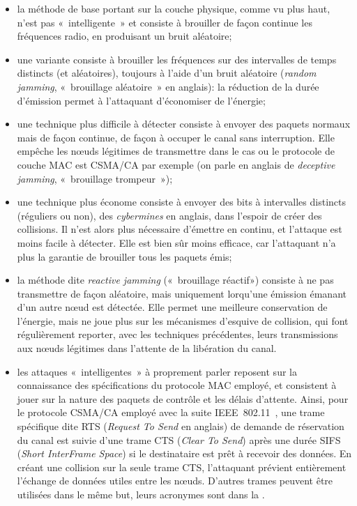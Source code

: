 \begin{itemize}
    \item la méthode de base portant sur la couche physique, comme vu plus haut, n'est pas « intelligente » et consiste à brouiller de façon continue les fréquences radio, en produisant un bruit aléatoire;
    \item une variante consiste à brouiller les fréquences sur des intervalles de temps distincts (et aléatoires), toujours à l'aide d'un bruit aléatoire (\textit{random jamming}, « brouillage aléatoire » en anglais): la réduction de la durée d'émission permet à l'attaquant d'économiser de l'énergie;
    \item une technique plus difficile à détecter consiste à envoyer des paquets normaux mais de façon continue, de façon à occuper le canal sans interruption. Elle empêche les nœuds légitimes de transmettre dans le cas ou le protocole de couche MAC est CSMA/CA par exemple (on parle en anglais de \textit{deceptive jamming}, « brouillage trompeur »);
    \item une technique plus économe consiste à envoyer des bits à intervalles distincts (réguliers ou non), des \textit{cybermines} en anglais, dans l'espoir de créer des collisions. Il n'est alors plus nécessaire d'émettre en continu, et l'attaque est moins facile à détecter. Elle est bien sûr moins efficace, car l'attaquant n'a plus la garantie de brouiller tous les paquets émis;
    \item la méthode dite \textit{reactive jamming} (« brouillage réactif») consiste à ne pas transmettre de façon aléatoire, mais uniquement lorqu'une émission émanant d'un autre nœud est détectée. Elle permet une meilleure conservation de l'énergie, mais ne joue plus sur les mécanismes d'esquive de collision, qui font régulièrement reporter, avec les techniques précédentes, leurs transmissions aux nœuds légitimes dans l'attente de la libération du canal.
    \item les attaques « intelligentes » à proprement parler reposent sur la connaissance des spécifications du protocole MAC employé, et consistent à jouer sur la nature des paquets de contrôle et les délais d'attente. Ainsi, pour le protocole CSMA/CA employé avec la suite IEEE~802.11~\cite{ieee802.11}, une trame spécifique dite RTS (\textit{Request To Send} en anglais) de demande de réservation du canal est suivie d'une trame CTS (\textit{Clear To Send}) après une durée SIFS (\textit{Short InterFrame Space}) si le destinataire est prêt à recevoir des données. En créant une collision sur la seule trame CTS, l'attaquant prévient entièrement l'échange de données utiles entre les nœuds. D'autres trames peuvent être utilisées dans le même but, leurs acronymes sont dans la .
\end{itemize}

